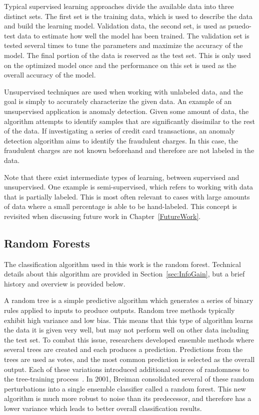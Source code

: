 \documentclass[12pt]{report}
\begin{document}
Typical supervised learning approaches divide the available data into three distinct sets.
The first set is the training data, which is used to describe the data and build the learning model.
Validation data, the second set, is used as psuedo-test data to estimate how well the model has been trained.
The validation set is tested several times to tune the parameters and maximize the accuracy of the model.
The final portion of the data is reserved as the test set.
This is only used on the optimized model once and the performance on this set is used as the overall accuracy of the model.

Unsupervised techniques are used when working with unlabeled data, and the goal is simply to accurately characterize the given data.
An example of an unsupervised application is anomaly detection.
Given some amount of data, the algorithm attempts to identify samples that are significantly dissimilar to the rest of the data.
If investigating a series of credit card transactions, an anomaly detection algorithm aims to identify the fraudulent charges.
In this case, the fraudulent charges are not known beforehand and therefore are not labeled in the data.

Note that there exist intermediate types of learning, between supervised and unsupervised.
One example is semi-supervised, which refers to working with data that is partially labeled.
This is most often relevant to cases with large amounts of data where a small percentage is able to be hand-labeled.
This concept is revisited when discussing future work in Chapter~\ref{FutureWork}.

\subsection{Random Forests}
The classification algorithm used in this work is the random forest.
Technical details about this algorithm are provided in Section~\ref{sec:InfoGain}, but a brief history and overview is provided below.

A random tree is a simple predictive algorithm which generates a series of binary rules applied to inputs to produce outputs.
Random tree methods typically exhibit high variance and low bias.
This means that this type of algorithm learns the data it is given very well, but may not perform well on other data including the test set.
To combat this issue, researchers developed ensemble methods where several trees are created and each produces a prediction.
Predictions from the trees are used as votes, and the most common prediction is selected as the overall output.
Each of these variations introduced additional sources of randomness to the tree-training process~\cite{breiman1996bagging,dietterich2000experimental,amit1997shape}.
In 2001, Breiman consolidated several of these random perturbations into a single ensemble classifier called a random forest\cite{Breiman2001}.
This new algorithm is much more robust to noise than its predecessor, and therefore has a lower variance which leads to better overall classification results.
\end{document}
